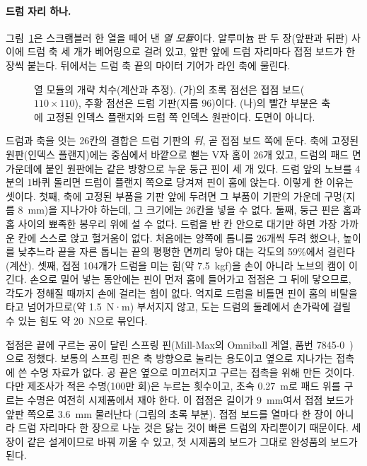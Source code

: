 \paragraph{드럼 자리 하나.} 그림~\ref{fig:hw-gear-dim-column}은 스크램블러 한 열을 떼어 낸 \emph{열 모듈}이다.
알루미늄 판 두 장(앞판과 뒤판) 사이에 드럼 축 세 개가 베어링으로 걸려 있고, 앞판 앞에 드럼 자리마다 접점
보드가 한 장씩 붙는다. 뒤에서는 드럼 축 끝의 마이터 기어가 라인 축에 물린다.

\begin{figure}[ht]
\centering

\caption{열 모듈의 개략 치수(계산과 추정). (가)의 초록 점선은 접점 보드($110 \times 110$), 주황 점선은 드럼
기판(지름 96)이다. (나)의 빨간 부분은 축에 고정된 인덱스 플랜지와 드럼 쪽 인덱스 원판이다. 도면이 아니다.}
\label{fig:hw-gear-dim-column}
\end{figure}

드럼과 축을 잇는 26칸의 결합은 드럼 기판의 \emph{뒤}, 곧 접점 보드 쪽에 둔다. 축에 고정된 원판(인덱스
플랜지)에는 중심에서 바깥으로 뻗는 V자 홈이 26개 있고, 드럼의 패드 면 가운데에 붙인 원판에는 같은 방향으로
누운 둥근 핀이 세 개 있다. 드럼 앞의 노브를 4분의 1바퀴 돌리면 드럼이 플랜지 쪽으로 당겨져 핀이 홈에 앉는다.
이렇게 한 이유는 셋이다. 첫째, 축에 고정된 부품을 기판 앞에 두려면 그 부품이 기판의 가운데 구멍(지름
8~mm)을 지나가야 하는데, 그 크기에는 26칸을 넣을 수 없다. 둘째, 둥근 핀은 홈과 홈 사이의 뾰족한 봉우리 위에
설 수 없다. 드럼을 반 칸 안으로 대기만 하면 가장 가까운 칸에 스스로 앉고 헐거움이 없다. 처음에는 양쪽에
톱니를 26개씩 두려 했으나, 높이를 낮추느라 끝을 자른 톱니는 끝의 평평한 면끼리 닿아 대는 각도의 59\%에서
걸린다(계산). 셋째, 접점 104개가 드럼을 미는 힘(약 7.5~kgf)을 손이 아니라 노브의 캠이 이긴다. 손으로 밀어
넣는 동안에는 핀이 먼저 홈에 들어가고 접점은 그 뒤에 닿으므로, 각도가 정해질 때까지 손에 걸리는 힘이 없다.
억지로 드럼을 비틀면 핀이 홈의 비탈을 타고 넘어가므로(약 1.5~N·m) 부서지지 않고, 도는 드럼의 둘레에서
손가락에 걸릴 수 있는 힘도 약 20~N으로 묶인다.

접점은 끝에 구르는 공이 달린 스프링 핀(Mill-Max의 Omniball 계열, 품번 7845-0~\cite{millmax-7845})으로 정했다. 보통의 스프링 핀은 축
방향으로 눌리는 용도이고 옆으로 지나가는 접촉에 쓴 수명 자료가 없다. 공 끝은 옆으로 미끄러지고 구르는
접촉을 위해 만든 것이다. 다만 제조사가 적은 수명(100만 회)은 누르는 횟수이고, 초속 0.27~m로 패드 위를 구르는
수명은 여전히 시제품에서 재야 한다. 이 접점은 길이가 9~mm여서 접점 보드가 앞판 쪽으로 3.6~mm 물러난다
(그림의 초록 부분). 접점 보드를 열마다 한 장이 아니라 드럼 자리마다 한 장으로 나눈 것은 닳는 것이 빠른 드럼의 자리뿐이기
때문이다. 세 장이 같은 설계이므로 바꿔 끼울 수 있고, 첫 시제품의 보드가 그대로 완성품의 보드가 된다.

